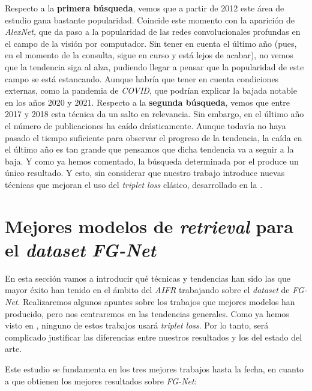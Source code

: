 Respecto a la \textbf{primera búsqueda}, vemos que a partir de 2012 este área de estudio gana bastante popularidad. Coincide este momento con la aparición de \textit{AlexNet}, que da paso a la popularidad de las redes convolucionales profundas en el campo de la visión por computador. Sin tener en cuenta el último año (pues, en el momento de la consulta, sigue en curso y está lejos de acabar), no vemos que la tendencia siga al alza, pudiendo llegar a pensar que la popularidad de este campo se está estancando. Aunque habría que tener en cuenta condiciones externas, como la pandemia de \textit{COVID}, que podrían explicar la bajada notable en los años 2020 y 2021. Respecto a la \textbf{segunda búsqueda}, vemos que entre 2017 y 2018 esta técnica da un salto en relevancia. Sin embargo, en el último año el número de publicaciones ha caído drásticamente. Aunque todavía no haya pasado el tiempo suficiente para observar el progreso de la tendencia, la caída en el último año es tan grande que pensamos que dicha tendencia va a seguir a la baja. Y como ya hemos comentado, la búsqueda determinada por el  produce un único resultado.  Y esto, sin considerar que nuestro trabajo introduce nuevas técnicas que mejoran el uso del \textit{triplet loss} clásico, desarrollado en la .

\section{Mejores modelos de \textit{retrieval} para el \textit{dataset} \textit{FG-Net}} \label{isec:mejores_modelos_estado_arte}

En esta sección vamos a introducir qué técnicas y tendencias han sido las que mayor éxito han tenido en el ámbito del \textit{AIFR} trabajando sobre el \textit{dataset} de \textit{FG-Net}. Realizaremos algunos apuntes sobre los trabajos que mejores modelos han producido, pero nos centraremos en las tendencias generales.
Como ya hemos visto en , ninguno de estos trabajos usará \textit{triplet loss}. Por lo tanto, será complicado justificar las diferencias entre nuestros resultados y los del estado del arte.

Este estudio se fundamenta en los tres mejores trabajos hasta la fecha, en cuanto a que obtienen los mejores resultados sobre \textit{FG-Net}:

